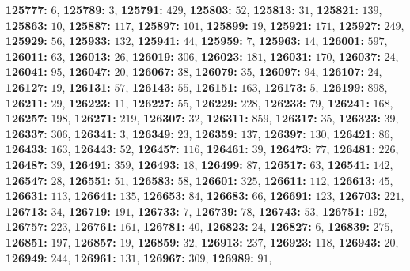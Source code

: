 \textsf{\bfseries 125777:} $6$, \textsf{\bfseries 125789:} $3$, \textsf{\bfseries 125791:} $429$, \textsf{\bfseries 125803:} $52$, \textsf{\bfseries 125813:} $31$, \textsf{\bfseries 125821:} $139$, \textsf{\bfseries 125863:} $10$, \textsf{\bfseries 125887:} $117$, \textsf{\bfseries 125897:} $101$, \textsf{\bfseries 125899:} $19$, \textsf{\bfseries 125921:} $171$, \textsf{\bfseries 125927:} $249$, \textsf{\bfseries 125929:} $56$, \textsf{\bfseries 125933:} $132$, \textsf{\bfseries 125941:} $44$, \textsf{\bfseries 125959:} $7$, \textsf{\bfseries 125963:} $14$, \textsf{\bfseries 126001:} $597$, \textsf{\bfseries 126011:} $63$, \textsf{\bfseries 126013:} $26$, \textsf{\bfseries 126019:} $306$, \textsf{\bfseries 126023:} $181$, \textsf{\bfseries 126031:} $170$, \textsf{\bfseries 126037:} $24$, \textsf{\bfseries 126041:} $95$, \textsf{\bfseries 126047:} $20$, \textsf{\bfseries 126067:} $38$, \textsf{\bfseries 126079:} $35$, \textsf{\bfseries 126097:} $94$, \textsf{\bfseries 126107:} $24$, \textsf{\bfseries 126127:} $19$, \textsf{\bfseries 126131:} $57$, \textsf{\bfseries 126143:} $55$, \textsf{\bfseries 126151:} $163$, \textsf{\bfseries 126173:} $5$, \textsf{\bfseries 126199:} $898$, \textsf{\bfseries 126211:} $29$, \textsf{\bfseries 126223:} $11$, \textsf{\bfseries 126227:} $55$, \textsf{\bfseries 126229:} $228$, \textsf{\bfseries 126233:} $79$, \textsf{\bfseries 126241:} $168$, \textsf{\bfseries 126257:} $198$, \textsf{\bfseries 126271:} $219$, \textsf{\bfseries 126307:} $32$, \textsf{\bfseries 126311:} $859$, \textsf{\bfseries 126317:} $35$, \textsf{\bfseries 126323:} $39$, \textsf{\bfseries 126337:} $306$, \textsf{\bfseries 126341:} $3$, \textsf{\bfseries 126349:} $23$, \textsf{\bfseries 126359:} $137$, \textsf{\bfseries 126397:} $130$, \textsf{\bfseries 126421:} $86$, \textsf{\bfseries 126433:} $163$, \textsf{\bfseries 126443:} $52$, \textsf{\bfseries 126457:} $116$, \textsf{\bfseries 126461:} $39$, \textsf{\bfseries 126473:} $77$, \textsf{\bfseries 126481:} $226$, \textsf{\bfseries 126487:} $39$, \textsf{\bfseries 126491:} $359$, \textsf{\bfseries 126493:} $18$, \textsf{\bfseries 126499:} $87$, \textsf{\bfseries 126517:} $63$, \textsf{\bfseries 126541:} $142$, \textsf{\bfseries 126547:} $28$, \textsf{\bfseries 126551:} $51$, \textsf{\bfseries 126583:} $58$, \textsf{\bfseries 126601:} $325$, \textsf{\bfseries 126611:} $112$, \textsf{\bfseries 126613:} $45$, \textsf{\bfseries 126631:} $113$, \textsf{\bfseries 126641:} $135$, \textsf{\bfseries 126653:} $84$, \textsf{\bfseries 126683:} $66$, \textsf{\bfseries 126691:} $123$, \textsf{\bfseries 126703:} $221$, \textsf{\bfseries 126713:} $34$, \textsf{\bfseries 126719:} $191$, \textsf{\bfseries 126733:} $7$, \textsf{\bfseries 126739:} $78$, \textsf{\bfseries 126743:} $53$, \textsf{\bfseries 126751:} $192$, \textsf{\bfseries 126757:} $223$, \textsf{\bfseries 126761:} $161$, \textsf{\bfseries 126781:} $40$, \textsf{\bfseries 126823:} $24$, \textsf{\bfseries 126827:} $6$, \textsf{\bfseries 126839:} $275$, \textsf{\bfseries 126851:} $197$, \textsf{\bfseries 126857:} $19$, \textsf{\bfseries 126859:} $32$, \textsf{\bfseries 126913:} $237$, \textsf{\bfseries 126923:} $118$, \textsf{\bfseries 126943:} $20$, \textsf{\bfseries 126949:} $244$, \textsf{\bfseries 126961:} $131$, \textsf{\bfseries 126967:} $309$, \textsf{\bfseries 126989:} $91$, 
